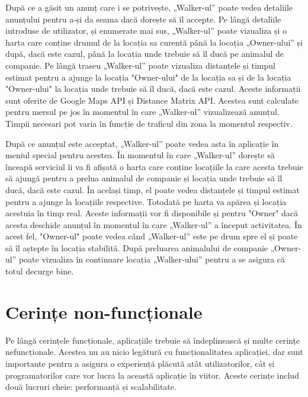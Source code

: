 După ce a găsit un anunț care i se potrivește, „Walker-ul” poate vedea detaliile anunțului pentru a-și da seama dacă dorește să îl accepte. Pe lângă detaliile introduse de utilizator, și enumerate mai sus, „Walker-ul” poate vizualiza și o harta care conține drumul de la locația sa curentă până la locația „Owner-ului” și după, dacă este cazul, până la locația unde trebuie să îl ducă pe animalul de companie. Pe lângă traseu „Walker-ul” poate vizualiza distanțele și timpul estimat pentru a ajunge la locația "Owner-ului" de la locația sa și de la locația "Owner-ului" la locația unde trebuie să îl ducă, dacă este cazul. Aceste informații sunt oferite de Google Maps API\cite{google_maps_platform} și Distance Matrix API\cite{distance_matrix}. Acestea sunt calculate pentru mersul pe jos în momentul în care  „Walker-ul” vizualizează anunțul. Timpii necesari pot varia în funcție de traficul din zona la momentul respectiv.

După ce anunțul este acceptat, „Walker-ul” poate vedea asta în aplicație în meniul special pentru acestea. În momentul în care „Walker-ul” dorește să înceapă serviciul îi va fi afișată o harta care conține locațiile la care acesta trebuie să ajungă pentru a prelua animalul de companie și locația unde trebuie să îl ducă, dacă este cazul. În același timp, el poate vedea distanțele și timpul estimat pentru a ajunge la locațiile respective. Totodată pe harta va apărea și locația acestuia în timp real. Aceste informații vor fi disponibile și pentru "Owner" dacă acesta deschide anunțul în momentul în care „Walker-ul” a început activitatea. În acest fel, "Owner-ul" poate vedea când „Walker-ul” este pe drum spre el și poate să îl aștepte în locația stabilită. După preluarea animalului de companie „Owner-ul” poate vizualiza în continuare locația  „Walker-ului” pentru a se asigura că totul decurge bine.

\section{Cerințe non-funcționale}
 
Pe lângă cerințele funcționale, aplicațiile trebuie să îndeplinească și multe cerințe nefuncționale. Acestea nu au nicio legătură cu funcționalitatea aplicației, dar sunt importante pentru a asigura o experiență plăcută atât utilizatorilor, cât și programatorilor care vor lucra la această aplicație în viitor. Aceste cerințe includ două lucruri cheie: performanță și scalabilitate. 

\newpage

